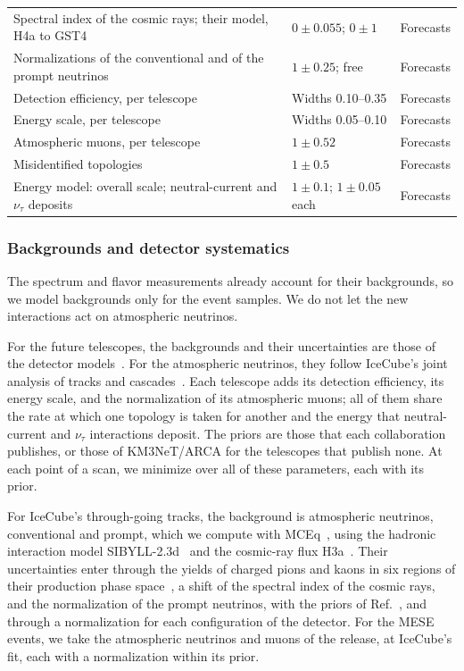 \documentclass[linenumbers, aps, prd, twocolumn, superscriptaddress, floatfix, longbibliography, nofootinbib, bibnotes]{revtex4-2}
\begin{document}
\begin{table}[t!]
\begin{ruledtabular}
\begin{tabular}{>{\raggedright\arraybackslash}p{}>{\raggedright\arraybackslash}p{}>{\raggedright\arraybackslash}p{}}
 Spectral index of the cosmic rays; their model, H4a to GST4 & $0 \pm 0.055$; $0 \pm 1$ & Forecasts \\
 Normalizations of the conventional and of the prompt neutrinos & $1 \pm 0.25$; free & Forecasts \\
 Detection efficiency, per telescope & Widths 0.10--0.35 & Forecasts \\
 Energy scale, per telescope & Widths 0.05--0.10 & Forecasts \\
 Atmospheric muons, per telescope & $1 \pm 0.52$ & Forecasts \\
 Misidentified topologies & $1 \pm 0.5$ & Forecasts \\
 Energy model: overall scale; neutral-current and $\nu_\tau$ deposits & $1 \pm 0.1$; $1 \pm 0.05$ each & Forecasts \\
 \end{tabular}
 \end{ruledtabular}
\end{table}

\subsubsection{Backgrounds and detector systematics}
The spectrum and flavor measurements already account for their backgrounds, so we model backgrounds only for the event samples.
We do not let the new interactions act on atmospheric neutrinos.

For the future telescopes, the backgrounds and their uncertainties are those of the detector models~\cite{Bustamante:2026inprep}.
For the atmospheric neutrinos, they follow IceCube's joint analysis of tracks and cascades~\cite{IceCube:2025ewu}.
Each telescope adds its detection efficiency, its energy scale, and the normalization of its atmospheric muons; all of them share the rate at which one topology is taken for another and the energy that neutral-current and $\nu_\tau$ interactions deposit.
The priors are those that each collaboration publishes, or those of KM3NeT/ARCA for the telescopes that publish none.
At each point of a scan, we minimize over all of these parameters, each with its prior.

For IceCube's through-going tracks, the background is atmospheric neutrinos, conventional and prompt, which we compute with MCEq~\cite{Fedynitch:2015zma}, using the hadronic interaction model SIBYLL-2.3d~\cite{Riehn:2019jet} and the cosmic-ray flux H3a~\cite{Gaisser:2011klf}.
Their uncertainties enter through the yields of charged pions and kaons in six regions of their production phase space~\cite{Barr:2006it}, a shift of the spectral index of the cosmic rays, and the normalization of the prompt neutrinos, with the priors of Ref.~\cite{Bustamante:2026inprep}, and through a normalization for each configuration of the detector.
For the MESE events, we take the atmospheric neutrinos and muons of the release, at IceCube's fit, each with a normalization within its prior.
\end{document}
